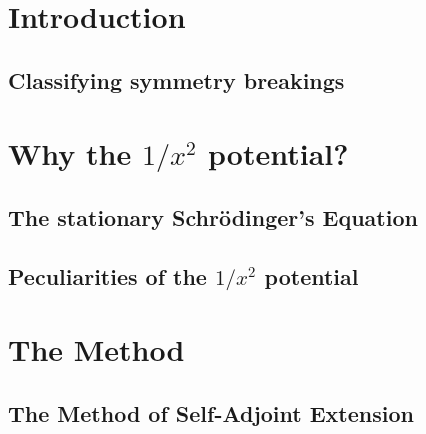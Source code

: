 \documentclass[a4paper,12pt,twoside]{report}
\begin{document}
\clearpage

\tableofcontents
{}
\clearpage

\newpage
\pagestyle{empty} %
\mbox{}
\clearpage

\pagestyle{fancy}


\chapter*{Introduction}



\clearpage

\section*{Classifying symmetry breakings}

\cleardoublepage{}

\chapter{Why the \texorpdfstring{$1/x^2$}{inverse squared} potential?} %

\section{The stationary Schrödinger's Equation}
\label{section:generic_potentials}

\clearpage

\section{Peculiarities of the \texorpdfstring{$1/x^2$}{inverse squared} potential}
\label{section:peculiarities}

\cleardoublepage{}

\chapter{The Method}

\section{The Method of Self-Adjoint Extension}
\label{section:self_adjoint}

\cleardoublepage{}
\end{document}
